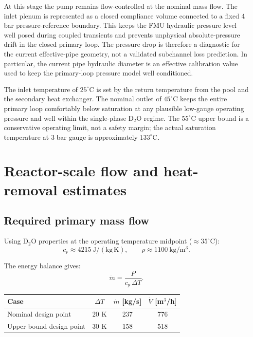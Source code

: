 \documentclass[11pt]{article}
\begin{document}
At this stage the pump remains flow-controlled at the nominal mass flow.
The inlet plenum is represented as a closed compliance volume connected to
a fixed 4 bar pressure-reference boundary.  This keeps the FMU hydraulic
pressure level well posed during coupled transients and prevents unphysical
absolute-pressure drift in the closed primary loop.  The pressure drop is therefore a diagnostic for the current
effective-pipe geometry, not a validated subchannel loss prediction.  In
particular, the current pipe hydraulic diameter is an effective calibration
value used to keep the primary-loop pressure model well conditioned.

The inlet temperature of $25^{\circ}\mathrm{C}$ is set by the return
temperature from the pool and the secondary heat exchanger.  The nominal
outlet of $45^{\circ}\mathrm{C}$ keeps the entire primary loop
comfortably below saturation at any plausible low-gauge operating
pressure and well within the single-phase D$_2$O regime.  The $55^{\circ}\mathrm{C}$
upper bound is a conservative operating limit, not a safety margin; the
actual saturation temperature at 3 bar gauge is approximately
$133^{\circ}\mathrm{C}$.

\section{Reactor-scale flow and heat-removal estimates}

\subsection{Required primary mass flow}

Using D$_2$O properties at the operating temperature midpoint
($\approx 35^{\circ}\mathrm{C}$):
\[
c_p \approx 4215\ \mathrm{J/(kg\,K)},
\qquad
\rho \approx 1100\ \mathrm{kg/m^3}.
\]

The energy balance gives:
\[
\dot{m} = \frac{P}{c_p\,\Delta T}.
\]

\begin{center}
\begin{tabular}{lccc}
\hline
Case & $\Delta T$ & $\dot{m}$ [kg/s] & $\dot{V}$ [m$^3$/h] \\
\hline
Nominal design point & 20 K & 237 & 776 \\
Upper-bound design point & 30 K & 158 & 518 \\
\hline
\end{tabular}
\end{center}
\end{document}
